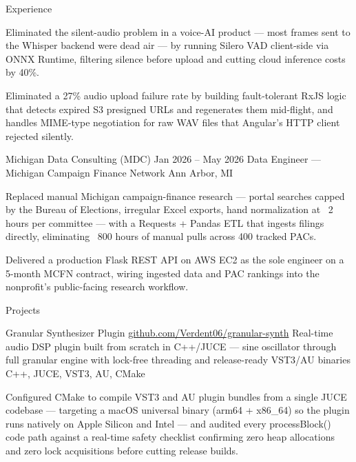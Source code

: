 \documentclass[
	11pt
]{../template}
\begin{document}
\begin{rSection}{E}{xperience}
\begin{rSectionEntry}
			\item Eliminated the silent-audio problem in a voice-AI product --- most frames sent to the Whisper backend were dead air --- by running Silero VAD client-side via ONNX Runtime, filtering silence before upload and cutting cloud inference costs by 40\%.
			\item Eliminated a 27\% audio upload failure rate by building fault-tolerant RxJS logic that detects expired S3 presigned URLs and regenerates them mid-flight, and handles MIME-type negotiation for raw WAV files that Angular's HTTP client rejected silently.
		\end{rSectionEntry}

		\begin{rSectionEntry}
			{Michigan Data Consulting (MDC)}
			{Jan 2026 -- May 2026}
			{Data Engineer --- Michigan Campaign Finance Network}
			{}
			{Ann Arbor, MI}

			\item Replaced manual Michigan campaign-finance research --- portal searches capped by the Bureau of Elections, irregular Excel exports, hand normalization at ~2 hours per committee --- with a Requests + Pandas ETL that ingests filings directly, eliminating ~800 hours of manual pulls across 400 tracked PACs.
			\item Delivered a production Flask REST API on AWS EC2 as the sole engineer on a 5-month MCFN contract, wiring ingested data and PAC rankings into the nonprofit's public-facing research workflow.
		\end{rSectionEntry}
	\end{rSection}

	\begin{rSection}{P}{rojects}
		\begin{rSectionEntry}
			{Granular Synthesizer Plugin}
			{\href{https://github.com/Verdent06/granular-synth}{github.com/Verdent06/granular-synth}}
			{Real-time audio DSP plugin built from scratch in C++/JUCE --- sine oscillator through full granular engine with lock-free threading and release-ready VST3/AU binaries}
			{C++, JUCE, VST3, AU, CMake}
			{}

			\item Configured CMake to compile VST3 and AU plugin bundles from a single JUCE codebase --- targeting a macOS universal binary (arm64 + x86\_64) so the plugin runs natively on Apple Silicon and Intel --- and audited every processBlock() code path against a real-time safety checklist confirming zero heap allocations and zero lock acquisitions before cutting release builds.
		\end{rSectionEntry}
	\end{rSection}
\end{document}
